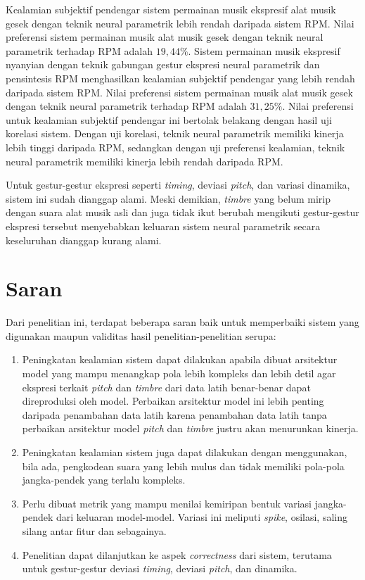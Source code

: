Kealamian subjektif pendengar sistem permainan musik ekspresif alat musik gesek dengan teknik neural parametrik lebih rendah daripada sistem RPM. Nilai preferensi sistem permainan musik alat musik gesek dengan teknik neural parametrik terhadap RPM adalah $19,44\%$. %
Sistem permainan musik ekspresif nyanyian dengan teknik gabungan gestur ekspresi neural parametrik dan pensintesis RPM menghasilkan kealamian subjektif pendengar yang lebih rendah daripada sistem RPM. Nilai preferensi sistem permainan musik alat musik gesek dengan teknik neural parametrik terhadap RPM adalah $31,25\%$. %
Nilai preferensi untuk kealamian subjektif pendengar ini bertolak belakang dengan hasil uji korelasi sistem. Dengan uji korelasi, teknik neural parametrik memiliki kinerja lebih tinggi daripada RPM, sedangkan dengan uji preferensi kealamian, teknik neural parametrik memiliki kinerja lebih rendah daripada RPM.

Untuk gestur-gestur ekspresi seperti \textit{timing}, deviasi \textit{pitch}, dan variasi dinamika, sistem ini sudah dianggap alami. Meski demikian, \textit{timbre} yang belum mirip dengan suara alat musik asli dan juga tidak ikut berubah mengikuti gestur-gestur ekspresi tersebut menyebabkan keluaran sistem neural parametrik secara keseluruhan dianggap kurang alami.

\section{Saran}

Dari penelitian ini, terdapat beberapa saran baik untuk memperbaiki sistem yang digunakan maupun validitas hasil penelitian-penelitian serupa:
\begin{enumerate}
	\item Peningkatan kealamian sistem dapat dilakukan apabila dibuat arsitektur model yang mampu menangkap pola lebih kompleks dan lebih detil agar ekspresi terkait \textit{pitch} dan \textit{timbre} dari data latih benar-benar dapat direproduksi oleh model. Perbaikan arsitektur model ini lebih penting daripada penambahan data latih karena penambahan data latih tanpa perbaikan arsitektur model \textit{pitch} dan \textit{timbre} justru akan menurunkan kinerja.
	\item Peningkatan kealamian sistem juga dapat dilakukan dengan menggunakan, bila ada, pengkodean suara yang lebih mulus dan tidak memiliki pola-pola jangka-pendek yang terlalu kompleks.
	\item Perlu dibuat metrik yang mampu menilai kemiripan bentuk variasi jangka-pendek dari keluaran model-model. Variasi ini meliputi \textit{spike}, osilasi, saling silang antar fitur dan sebagainya.
	\item Penelitian dapat dilanjutkan ke aspek \textit{correctness} dari sistem, terutama untuk gestur-gestur deviasi \textit{timing}, deviasi \textit{pitch}, dan dinamika.
\end{enumerate}